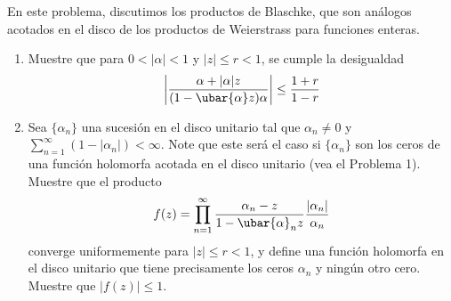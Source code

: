 \setcounter{pro}{1}
\begin{prob}
En este problema, discutimos los productos de Blaschke, que son análogos acotados en el disco de los productos de Weierstrass para funciones enteras.
\begin{enumerate}[label=(\alph*), leftmargin=1.5em]
    \item Muestre que para $0 < |\alpha| < 1$ y $|z| \le r < 1$, se cumple la desigualdad
    \[ \left| \frac{\alpha + |\alpha|z}{(1-\ubar{\alpha}z)\alpha} \right| \le \frac{1+r}{1-r} \]
    \item Sea $\{\alpha_n\}$ una sucesión en el disco unitario tal que $\alpha_n \neq 0$ y $\sum_{n=1}^\infty (1 - |\alpha_n|) < \infty$. Note que este será el caso si $\{\alpha_n\}$ son los ceros de una función holomorfa acotada en el disco unitario (vea el Problema 1). Muestre que el producto
    \[ 
    f(z) = \prod_{n=1}^\infty \frac{\alpha_n - z}{1 - \ubar{\alpha}_n z} \frac{|\alpha_n|}{\alpha_n} 
    \]
    converge uniformemente para $|z| \le r < 1$, y define una función holomorfa en el disco unitario que tiene precisamente los ceros $\alpha_n$ y ningún otro cero. Muestre que $|f(z)| \le 1$.
\end{enumerate}
\end{prob}
